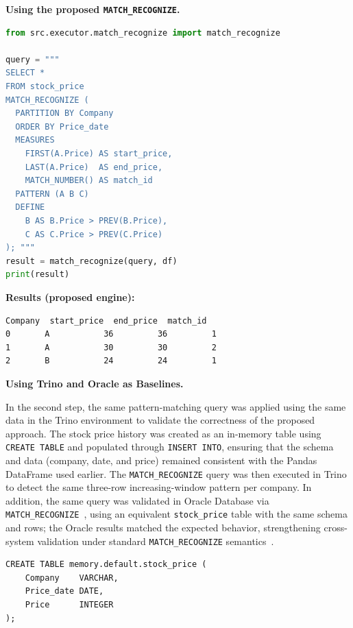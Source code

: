 \noindent\textbf{Using the proposed \texttt{MATCH\_RECOGNIZE}.}

\begin{lstlisting}[language=Python,
  basicstyle=\ttfamily\small,
  backgroundcolor=\color{gray!10},
  caption={[Using the proposed MATCH\_RECOGNIZE]Using the proposed \texttt{MATCH\_RECOGNIZE}.}]
from src.executor.match_recognize import match_recognize

query = """
SELECT *
FROM stock_price
MATCH_RECOGNIZE (
  PARTITION BY Company
  ORDER BY Price_date
  MEASURES
    FIRST(A.Price) AS start_price,
    LAST(A.Price)  AS end_price,
    MATCH_NUMBER() AS match_id
  PATTERN (A B C)
  DEFINE
    B AS B.Price > PREV(B.Price),
    C AS C.Price > PREV(C.Price)
); """
result = match_recognize(query, df)
print(result)
\end{lstlisting}

\noindent\textbf{Results (proposed engine):}
\begin{lstlisting}[basicstyle=\ttfamily\small, backgroundcolor=\color{gray!10}]
  Company  start_price  end_price  match_id
0       A           36         36         1
1       A           30         30         2
2       B           24         24         1
\end{lstlisting}

\noindent\textbf{Using Trino and Oracle as Baselines.}

In the second step, the same pattern-matching query was applied using the
same data in the Trino environment to validate the correctness of the proposed
approach.  The stock price history was created as an in-memory table
using \texttt{CREATE TABLE} and populated through \texttt{INSERT INTO},
ensuring that the schema and data (company, date, and price) remained
consistent with the Pandas DataFrame used earlier.  The
\texttt{MATCH\_RECOGNIZE} query was then executed in Trino to detect
the same three-row increasing-window pattern per company.  In
addition, the same query was validated in Oracle Database via
\texttt{MATCH\_RECOGNIZE}~\cite{petkovic2022rpr,monierashraf2025oracle},
using an equivalent \texttt{stock\_price} table with the same schema and
rows; the Oracle results matched the expected behavior, strengthening
cross-system validation under standard \texttt{MATCH\_RECOGNIZE}
semantics~\cite{monierashraf2025oracle}.

\begin{lstlisting}[basicstyle=\ttfamily\small,
  backgroundcolor=\color{gray!10},
  caption={[Create table in Trino]Creating the in-memory table in Trino.}]
CREATE TABLE memory.default.stock_price (
    Company    VARCHAR,
    Price_date DATE,
    Price      INTEGER
);
\end{lstlisting}

